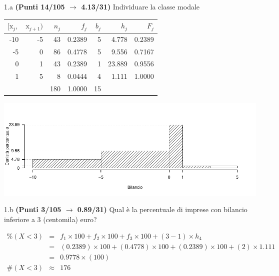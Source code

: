 \documentclass[
  11pt,
]{book}
\theoremstyle{mytheoremstyle}
\theoremstyle{mydefstyle}
\newenvironment{sol}
  {
  \begin{tcolorbox}[enhanced,breakable,arc=0.1mm,boxrule=1pt,colback=white,colframe=iblue,
  title=\bf \fontfamily{lmss}\selectfont \hspace{.5 cm} Soluzione,drop fuzzy shadow]

}{
\end{tcolorbox}
  }
\begin{document}
1.a \textbf{(Punti 14/105 \(\rightarrow\) 4.13/31)} Individuare la classe modale

\begin{sol}

\begin{table}[H]
\centering
\begin{tabular}{rrrrrrr}
\toprule
$[\text{x}_j,$ & $\text{x}_{j+1})$ & $n_j$ & $f_j$ & $b_j$ & $h_j$ & $F_j$\\
\midrule
-10 & -5 & 43 & 0.2389 & 5 & 4.778 & 0.2389\\
-5 & 0 & 86 & 0.4778 & 5 & 9.556 & 0.7167\\
0 & 1 & 43 & 0.2389 & 1 & 23.889 & 0.9556\\
1 & 5 & 8 & 0.0444 & 4 & 1.111 & 1.0000\\
 &  & 180 & 1.0000 & 15 &  & \\
\bottomrule
\end{tabular}
\end{table}

\begin{center}\includegraphics{Esami_passati_con_soluzioni_files/figure-latex/2023-204-1} \end{center}

\end{sol}

1.b \textbf{(Punti 3/105 \(\rightarrow\) 0.89/31)} Qual è la percentuale di imprese con bilancio inferiore a 3 (centomila) euro?

\begin{sol}
\begin{eqnarray*}
     \%(X< 3 ) &=&  f_{ 1 }\times 100+f_{ 2 }\times 100+f_{ 3 }\times 100 +( 3 - 1 )\times h_{ 4 } \\
              &=&  ( 0.2389 )\times 100+( 0.4778 )\times 100+( 0.2389 )\times 100 +( 2 )\times  1.111  \\
              &=&  0.9778 \times(100) \\
     \#(X< 3 ) &\approx& 176 
         \end{eqnarray*}

\end{sol}
\end{document}
